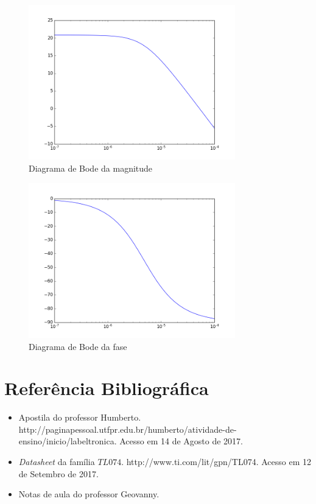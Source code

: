 \documentclass[12pt, a4paper, twoside]{article}
\begin{document}
\begin{figure}
    \centering
    \includegraphics[width=0.8\textwidth]{figs/rel2/ex4-mag.png}
    \caption{Diagrama de Bode da magnitude}
\end{figure}

\begin{figure}
    \centering
    \includegraphics[width=0.8\textwidth]{figs/rel2/ex4-phase.png}
    \caption{Diagrama de Bode da fase}
\end{figure}

\section{Referência Bibliográfica}

\begin{itemize}
    \item Apostila do professor Humberto. http://paginapessoal.utfpr.edu.br/humberto/atividade-de-ensino/inicio/labeltronica. Acesso em 14 de Agosto de 2017.
    \item \textit{Datasheet} da família $TL074$. http://www.ti.com/lit/gpn/TL074. Acesso em 12 de Setembro de 2017.
    \item Notas de aula do professor Geovanny.
\end{itemize}
\end{document}
